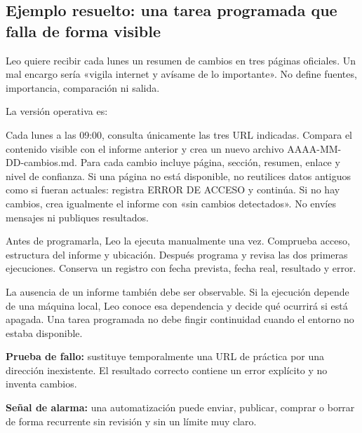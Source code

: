 \documentclass[10pt,a4paper,openany]{book}
\newenvironment{Shaded}{}{}
\newcommand{\NormalTok}[1]{#1}
\renewenvironment{Shaded}
  {\begin{tcolorbox}[
    enhanced,
    breakable,
    colback=CodeBg,
    colframe=Border,
    boxrule=0.5pt,
    arc=2mm,
    left=3mm,
    right=3mm,
    top=2.2mm,
    bottom=2.2mm,
    before skip=0.8em,
    after skip=0.9em
  ]}
  {\end{tcolorbox}}
\begin{document}
\subsection{Ejemplo resuelto: una tarea programada que falla de forma
visible}\label{ejemplo-resuelto-una-tarea-programada-que-falla-de-forma-visible}

Leo quiere recibir cada lunes un resumen de cambios en tres páginas
oficiales. Un mal encargo sería «vigila internet y avísame de lo
importante». No define fuentes, importancia, comparación ni salida.

La versión operativa es:

\begin{Shaded}
\begin{Highlighting}[]
\NormalTok{Cada lunes a las 09:00, consulta únicamente las tres URL indicadas.}
\NormalTok{Compara el contenido visible con el informe anterior y crea un nuevo archivo}
\NormalTok{AAAA{-}MM{-}DD{-}cambios.md. Para cada cambio incluye página, sección, resumen,}
\NormalTok{enlace y nivel de confianza. Si una página no está disponible, no reutilices}
\NormalTok{datos antiguos como si fueran actuales: registra ERROR DE ACCESO y continúa.}
\NormalTok{Si no hay cambios, crea igualmente el informe con «sin cambios detectados».}
\NormalTok{No envíes mensajes ni publiques resultados.}
\end{Highlighting}
\end{Shaded}

Antes de programarla, Leo la ejecuta manualmente una vez. Comprueba
acceso, estructura del informe y ubicación. Después programa y revisa
las dos primeras ejecuciones. Conserva un registro con fecha prevista,
fecha real, resultado y error.

La ausencia de un informe también debe ser observable. Si la ejecución
depende de una máquina local, Leo conoce esa dependencia y decide qué
ocurrirá si está apagada. Una tarea programada no debe fingir
continuidad cuando el entorno no estaba disponible.

\begin{tipbox}

\textbf{Prueba de fallo:} sustituye temporalmente una URL de práctica
por una dirección inexistente. El resultado correcto contiene un error
explícito y no inventa cambios.

\end{tipbox}

\begin{warningbox}

\textbf{Señal de alarma:} una automatización puede enviar, publicar,
comprar o borrar de forma recurrente sin revisión y sin un límite muy
claro.

\end{warningbox}
\end{document}
